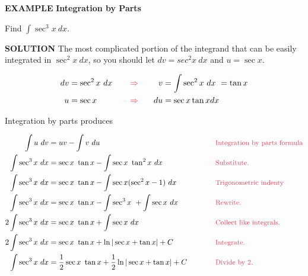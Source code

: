 \documentclass[oneside]{book}
\begin{document}
\bigskip

\noindent \color{myblue} \large \textbf{EXAMPLE} \color{black} \normalsize \textbf{Integration by Parts}
\rmfamily

\bigskip

\noindent Find $\displaystyle \int \sec^3 x \ dx$.
\sffamily

\bigskip

\noindent \color{myblue} \textbf{SOLUTION} \color{black} \rmfamily \hspace{.3cm}The most complicated portion of the integrand that can be easily integrated in $\sec^2 x \ dx$, so you should let $dv = sec^2 x \ dx$ and $u = \sec x$.

\begin{alignat*}{3}
dv &= \sec^2 x \ dx       &  \hspace{.3cm} &\color{mypink} \Rightarrow \color{black}   & \hspace{.5cm}  v&= \int \sec^2 x \ dx \ = \tan x \\
u &= \sec x &   &\color{mypink} \Rightarrow \color{black}   &   du&= \sec x \tan x dx \\
\end{alignat*}
\pagebreak

\noindent Integration by parts produces

\begin{align*}
\int u \ dv &= uv - \int v \ du \hspace{5cm} &&\text{\color{mypink}\small Integration by parts formula}\color{black}\\
\int \sec^3 x \ dx &= \sec x \ \tan x - \int \sec x \ \tan^2 x \ dx  &&\text{\color{mypink}\small Substitute.}\color{black}\\
\int \sec^3 x \ dx &= \sec x \ \tan x - \int \sec x (\sec^2 x - 1) \ dx  &&\text{\color{mypink}\small Trigonometric indenty}\color{black}\\
\int \sec^3 x \ dx &= \sec x \ \tan x - \int \sec^3 x \ + \int \sec x \ dx  &&\text{\color{mypink}\small Rewrite.}\color{black}\\
2 \int \sec^3 x \ dx &= \sec x \ \tan x + \int \sec x \ dx  &&\text{\color{mypink}\small Collect like integrals.}\color{black}\\
2 \int \sec^3 x \ dx &= \sec x \ \tan x + \ln |\sec x + \tan x| + C  &&\text{\color{mypink}\small Integrate.}\color{black}\\
\int \sec^3 x \ dx &= \frac{1}{2} \sec x \ \tan x + \frac{1}{2}\ln |\sec x + \tan x| + C  &&\text{\color{mypink}\small Divide by 2.}\color{black}\\
\end{align*}
\end{document}
